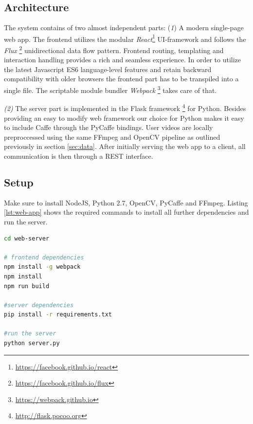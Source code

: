 \subsection{Architecture}
The system contains of two almost independent parts:
(\textit{1}) A modern single-page web app.
The frontend utilizes the modular \textit{React}\footnote{\url{https://facebook.github.io/react}} UI-framework and follows the \textit{Flux} \footnote{\url{https://facebook.github.io/flux}} unidirectional data flow pattern.
Frontend routing, templating and interaction handling provides a rich and seamless experience.
In order to utilize the latest Javascript ES6 language-level features and retain backward compatibility with older browsers the frontend part has to be transpiled into a single file.
The scriptable module bundler \textit{Webpack} \footnote{\url{https://webpack.github.io}} takes care of that.

\textit{(2)} The server part is implemented in the Flask framework \footnote{\url{http://flask.pocoo.org}} for Python.
Besides providing an easy to modify web framework our choice for Python makes it easy to include Caffe through the PyCaffe bindings.
User videos are locally preproccessed using the same FFmpeg and OpenCV pipeline as outlined previously in section \ref{sec:data}.
After initially serving the web app to a client, all communication is then through a REST interface.

\subsection{Setup}
Make sure to install NodeJS, Python 2.7, OpenCV, PyCaffe and FFmpeg.
Listing \ref{lst:web-app} shows the required commands to install all further dependencies and run the server.

\begin{lstlisting}[language=sh, caption=Web Application Setup, label=lst:web-app]
cd web-server

# frontend dependencies
npm install -g webpack
npm install
npm run build

#server dependencies
pip install -r requirements.txt

#run the server
python server.py
\end{lstlisting}